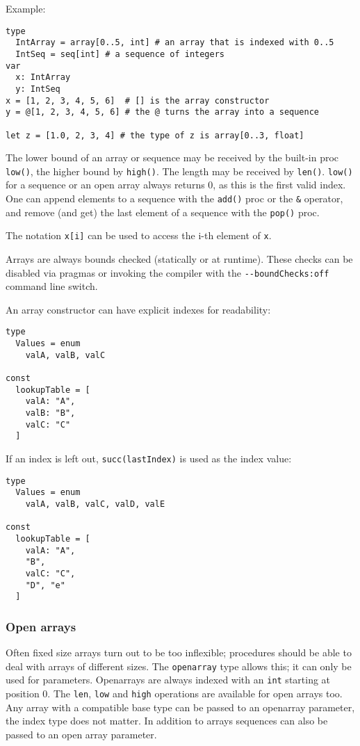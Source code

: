 Example:

\begin{verbatim}
type
  IntArray = array[0..5, int] # an array that is indexed with 0..5
  IntSeq = seq[int] # a sequence of integers
var
  x: IntArray
  y: IntSeq
x = [1, 2, 3, 4, 5, 6]  # [] is the array constructor
y = @[1, 2, 3, 4, 5, 6] # the @ turns the array into a sequence

let z = [1.0, 2, 3, 4] # the type of z is array[0..3, float]
\end{verbatim}

The lower bound of an array or sequence may be received by the built-in
proc \texttt{low()}, the higher bound by \texttt{high()}. The length may
be received by \texttt{len()}. \texttt{low()} for a sequence or an open
array always returns 0, as this is the first valid index. One can append
elements to a sequence with the \texttt{add()} proc or the \texttt{\&}
operator, and remove (and get) the last element of a sequence with the
\texttt{pop()} proc.

The notation \texttt{x{[}i{]}} can be used to access the i-th element of
\texttt{x}.

Arrays are always bounds checked (statically or at runtime). These
checks can be disabled via pragmas or invoking the compiler with the
\texttt{-\/-boundChecks:off} command line switch.

An array constructor can have explicit indexes for readability:

\begin{verbatim}
type
  Values = enum
    valA, valB, valC

const
  lookupTable = [
    valA: "A",
    valB: "B",
    valC: "C"
  ]
\end{verbatim}

If an index is left out, \texttt{succ(lastIndex)} is used as the index
value:

\begin{verbatim}
type
  Values = enum
    valA, valB, valC, valD, valE

const
  lookupTable = [
    valA: "A",
    "B",
    valC: "C",
    "D", "e"
  ]
\end{verbatim}

\hypertarget{open-arrays}{%
\subsubsection{Open arrays}\label{open-arrays}}

Often fixed size arrays turn out to be too inflexible; procedures should
be able to deal with arrays of different sizes. The \texttt{openarray}
type allows this; it can only be used for parameters. Openarrays are
always indexed with an \texttt{int} starting at position 0. The
\texttt{len}, \texttt{low} and \texttt{high} operations are available
for open arrays too. Any array with a compatible base type can be passed
to an openarray parameter, the index type does not matter. In addition
to arrays sequences can also be passed to an open array parameter.


